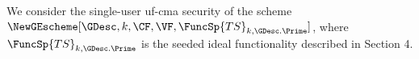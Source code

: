 %
%
%
%
%
%

 We consider the single-user uf-cma security of the scheme $\NewGEscheme[\GDesc, k, \CF, \VF, \FuncSp{TS}_{k,\GDesc.\Prime}]$, where $\FuncSp{TS}_{k,\GDesc.\Prime}$ is the seeded ideal functionality described in Section 4.


